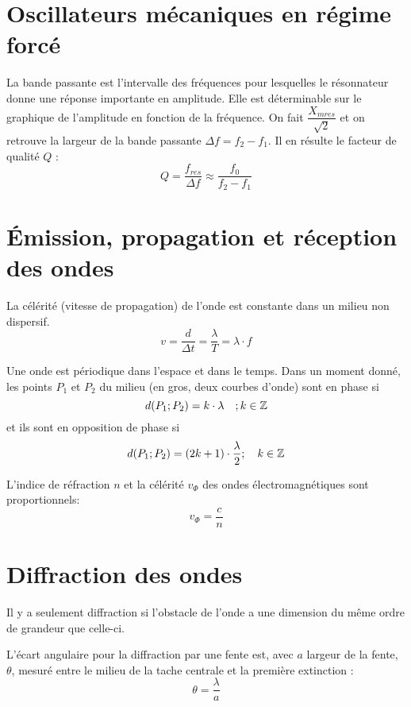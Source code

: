 \documentclass[main.tex]{subfiles}
\begin{document}
\section{Oscillateurs mécaniques en régime forcé}

\begin{Definition}
    La bande passante est l'intervalle des fréquences pour lesquelles le résonnateur donne une réponse importante en amplitude. Elle est déterminable sur le graphique de l'amplitude en fonction de la fréquence. On fait $\dfrac{X_{mres}}{\sqrt{2}}$ et on retrouve la largeur de la bande passante $\Delta f = f_{2} - f_{1}$. Il en résulte le facteur de qualité $Q$ :
    $$Q=\dfrac{f_{res}}{\Delta f} \approx \dfrac{f_{0}}{f_{2}-f_{1}}$$
\end{Definition}



\section{Émission, propagation et réception des ondes}

\begin{Definition}
    La célérité (vitesse de propagation) de l'onde est constante dans un milieu non dispersif.
    $$v=\dfrac{d}{\Delta t} = \dfrac{\lambda}{T} = \lambda \cdot f$$

    Une onde est périodique dans l'espace et dans le temps. Dans un moment donné, les points $P_{1}$ et $P_{2}$ du milieu (en gros, deux courbes d'onde) sont en phase si
    $$d(P_{1};P_{2})=k\cdot\lambda\quad;k\in\mathbb{Z}$$
    et ils sont en opposition de phase si
    $$d(P_{1};P_{2})=(2k+1) \cdot \dfrac{\lambda}{2} ; \quad k \in \mathbb{Z}$$

    L'indice de réfraction $n$ et la célérité $v_{\Phi}$ des ondes électromagnétiques sont proportionnels:
    $$v_{\Phi} = \dfrac{c}{n}$$
\end{Definition}


\section{Diffraction des ondes}

\begin{Definition}
    Il y a seulement diffraction si l'obstacle de l'onde a une dimension du même ordre de grandeur que celle-ci.

    L'écart angulaire pour la diffraction par une fente est, avec $a$ largeur de la fente, $\theta$, mesuré entre le milieu de la tache centrale et la première extinction :
    $$\theta=\dfrac{\lambda}{a}$$
\end{Definition}
\end{document}
